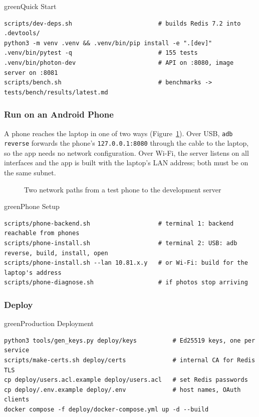 \begin{pbox}{green}{Quick Start}
\begin{lstlisting}[style=code, backgroundcolor=\color{white}]
scripts/dev-deps.sh                        # builds Redis 7.2 into .devtools/
python3 -m venv .venv && .venv/bin/pip install -e ".[dev]"
.venv/bin/pytest -q                        # 155 tests
.venv/bin/photon-dev                       # API on :8080, image server on :8081
scripts/bench.sh                           # benchmarks -> tests/bench/results/latest.md
\end{lstlisting}
\end{pbox}

\subsubsection{Run on an Android Phone}

A phone reaches the laptop in one of two ways (Figure~\ref{fig:devnet}). Over USB, \texttt{adb reverse} forwards the phone's \texttt{127.0.0.1:8080} through the cable to the laptop, so the app needs no network configuration. Over Wi-Fi, the server listens on all interfaces and the app is built with the laptop's LAN address; both must be on the same subnet.

\begin{figure}[H]
\centering
{}
\caption{Two network paths from a test phone to the development server}\label{fig:devnet}
\end{figure}

\begin{pbox}{green}{Phone Setup}
\begin{lstlisting}[style=code, backgroundcolor=\color{white}]
scripts/phone-backend.sh                   # terminal 1: backend reachable from phones
scripts/phone-install.sh                   # terminal 2: USB: adb reverse, build, install, open
scripts/phone-install.sh --lan 10.81.x.y   # or Wi-Fi: build for the laptop's address
scripts/phone-diagnose.sh                  # if photos stop arriving
\end{lstlisting}
\end{pbox}

\subsubsection{Deploy}

\begin{pbox}{green}{Production Deployment}
\begin{lstlisting}[style=code, backgroundcolor=\color{white}]
python3 tools/gen_keys.py deploy/keys          # Ed25519 keys, one per service
scripts/make-certs.sh deploy/certs             # internal CA for Redis TLS
cp deploy/users.acl.example deploy/users.acl   # set Redis passwords
cp deploy/.env.example deploy/.env             # host names, OAuth clients
docker compose -f deploy/docker-compose.yml up -d --build
\end{lstlisting}
\end{pbox}

